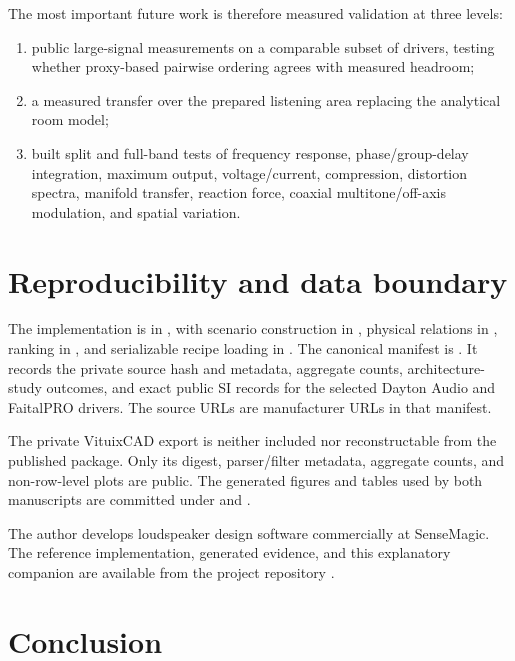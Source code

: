 \documentclass[11pt,a4paper]{article}
\numberwithin{equation}{section}
\begin{document}
The most important future work is therefore measured validation at three
levels:

\begin{enumerate}
	\item public large-signal measurements on a comparable subset of drivers,
	testing whether proxy-based pairwise ordering agrees with measured
	headroom;
	\item a measured transfer over the prepared listening area replacing the
	analytical room model;
	\item built split and full-band tests of frequency response,
	phase/group-delay integration, maximum output, voltage/current,
	compression, distortion spectra, manifold transfer, reaction force,
	coaxial multitone/off-axis modulation, and spatial variation.
\end{enumerate}

\section{Reproducibility and data boundary}
\label{sec:availability}

The implementation is in , with scenario construction
in , physical relations in , ranking in
, and serializable recipe loading in .
The canonical manifest is
.  It records the
private source hash and metadata, aggregate counts, architecture-study
outcomes, and exact public SI records for the selected Dayton Audio and
FaitalPRO drivers.  The source URLs are
manufacturer URLs in that manifest.

The private VituixCAD export is neither included nor reconstructable from the
published package.  Only its digest, parser/filter metadata, aggregate
counts, and non-row-level plots are public.  The generated figures and tables
used by both manuscripts are committed under
 and .

The author develops loudspeaker design software commercially at SenseMagic.
The reference implementation, generated evidence, and this explanatory
companion are available from the project repository
\cite{audioshape-preprint}.

\section{Conclusion}
\label{sec:conclusion}
\end{document}
